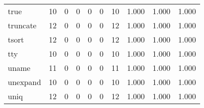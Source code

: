 \begin{longtable}{lp{1.3cm}p{1.3cm}p{1.3cm}p{1.3cm}p{1.3cm}p{1.3cm}p{1.3cm}p{1.3cm}p{1.3cm}}
true      &                     10 &                                             0 &                                            0 &                                           0 &                                            0 &                                         10 &                                1.000 &                                  1.000 &                                1.000 \\
truncate  &                     12 &                                             0 &                                            0 &                                           0 &                                            0 &                                         12 &                                1.000 &                                  1.000 &                                1.000 \\
tsort     &                     12 &                                             0 &                                            0 &                                           0 &                                            0 &                                         12 &                                1.000 &                                  1.000 &                                1.000 \\
tty       &                     10 &                                             0 &                                            0 &                                           0 &                                            0 &                                         10 &                                1.000 &                                  1.000 &                                1.000 \\
uname     &                     11 &                                             0 &                                            0 &                                           0 &                                            0 &                                         11 &                                1.000 &                                  1.000 &                                1.000 \\
unexpand  &                     10 &                                             0 &                                            0 &                                           0 &                                            0 &                                         10 &                                1.000 &                                  1.000 &                                1.000 \\
uniq      &                     12 &                                             0 &                                            0 &                                           0 &                                            0 &                                         12 &                                1.000 &                                  1.000 &                                1.000 \\

\end{longtable}
